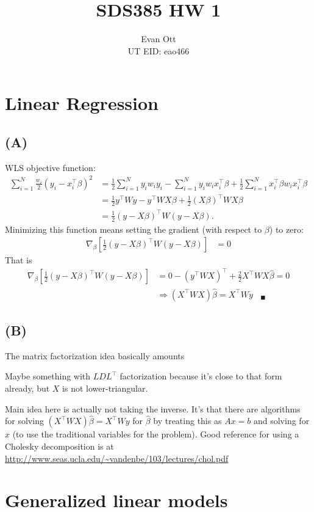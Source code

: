 \documentclass{article}
\title{\vspace{-6ex}SDS385 HW 1\vspace{-2ex}}
\author{Evan Ott \\ UT EID: eao466\vspace{-2ex}}
\begin{document}
\maketitle
\section{Linear Regression}
\subsection{(A)}
WLS objective function:
\begin{align*}
\sum_{i=1}^N\frac{w_i}{2}(y_i-x_i^\top\beta)^2&=\frac{1}{2}\sum_{i=1}^Ny_iw_iy_i - \sum_{i=1}^Ny_iw_ix_i^\top\beta+\frac{1}{2}\sum_{i=1}^Nx_i^\top\beta w_ix_i^\top\beta\\
&=\frac{1}{2}y^\top W y - y^\top W X \beta + \frac{1}{2}(X\beta)^\top WX\beta\\
&=\frac{1}{2}(y-X\beta)^\top W(y-X\beta).
\end{align*}
Minimizing this function means setting the gradient (with respect to $\beta$) to zero:
\begin{align*}
\nabla_\beta\left[\frac{1}{2}(y-X\beta)^\top W(y-X\beta)\right]&=0
\end{align*}
That is
\begin{align*}
\nabla_\beta\left[\frac{1}{2}(y-X\beta)^\top W(y-X\beta)\right]&=0-(y^\top WX)^\top+\frac{2}{2}X^\top WX\hat{\beta}=0\\
&\Rightarrow (X^\top WX)\hat{\beta}=X^\top Wy~~~~_\blacksquare
\end{align*}

\subsection{(B)}
The matrix factorization idea basically amounts 

Maybe something with $LDL^\top$ factorization because it's close to that form already, but $X$ is not lower-triangular.

Main idea here is actually not taking the inverse. It's that there are algorithms for solving $(X^\top WX)\hat{\beta}=X^\top Wy$ for $\hat{\beta}$ by treating this as $Ax=b$ and solving for $x$ (to use the traditional variables for the problem).
Good reference for using a Cholesky decomposition is at \url{http://www.seas.ucla.edu/~vandenbe/103/lectures/chol.pdf}

\section{Generalized linear models}
\end{document}
